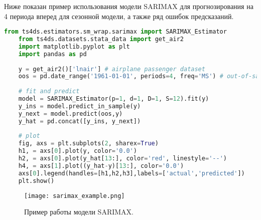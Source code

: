 \documentclass[../report.tex]{subfiles}
\begin{document}
	Ниже показан пример использования модели SARIMAX для прогнозирования на 4 периода вперед для сезонной модели, а также ряд ошибок предсказаний.
	
	\begin{lstlisting}[language=Python]
	from ts4ds.estimators.sm_wrap.sarimax import SARIMAX_Estimator
	from ts4ds.datasets.stata_data import get_air2
	import matplotlib.pyplot as plt
	import pandas as pd
	
	y = get_air2()['lnair'] # airplane passenger dataset
	oos = pd.date_range('1961-01-01', periods=4, freq='MS') # out-of-sample
	
	# fit and predict
	model = SARIMAX_Estimator(p=1, d=1, D=1, S=12).fit(y)
	y_ins = model.predict_in_sample(y)
	y_next = model.predict(oos,y)
	y_hat = pd.concat([y_ins, y_next])
	
	# plot
	fig, axs = plt.subplots(2, sharex=True)
	h1, = axs[0].plot(y, color='0.0')
	h2, = axs[0].plot(y_hat[13:], color='red', linestyle='--')
	h4, = axs[1].plot((y_hat-y)[13:], color='0.0')
	axs[0].legend(handles=[h1,h2,h3],labels=['actual','predicted'])
	plt.show()
	\end{lstlisting}
	
	\begin{figure}
		\texttt{[image: sarimax\_example.png]}
		\caption{Пример работы модели SARIMAX.}
		\label{fig:ts4ds-sarimax-example}
	\end{figure}
	
	
	
\end{document}
